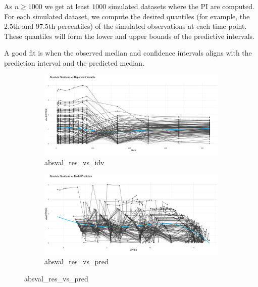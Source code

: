 As $n \geq 1000$ we get at least $1000$ simulated datasets where the PI are computed. For each simulated dataset, we compute the desired quantiles (for example, the $2.5$th and $97.5$th percentiles) of the simulated observations at each time point. These quantiles will form the lower and upper bounds of the predictive intervals.

A good fit is when the observed median and confidence intervals aligns with the prediction interval and the predicted median. 

\begin{figure}[htbp]
    \centering
    \begin{subfigure}[b]{0.45\linewidth}
        \centering
        \includegraphics[width=\linewidth]{fig/img/Xpose/absval_res_vs_idv.pdf}
        \caption{absval\_res\_vs\_idv}
        \label{fig:absval_res_vs_idv}
    \end{subfigure}
    \hfill
    \begin{subfigure}[b]{0.45\linewidth}
        \centering
        \includegraphics[width=\linewidth]{fig/img/Xpose/absval_res_vs_pred.pdf}
        \caption{absval\_res\_vs\_pred}
        \label{fig:absval_res_vs_pred}
    \end{subfigure}
    

\end{figure}

